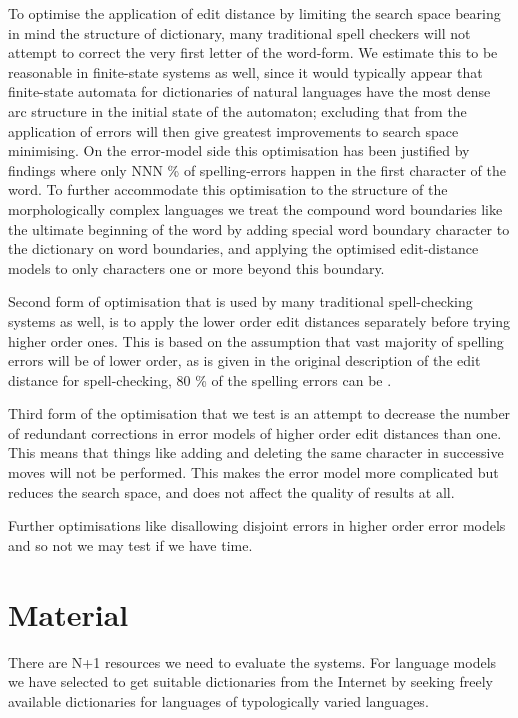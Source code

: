 \documentclass[11pt]{article}
\begin{document}
To optimise the application of edit distance by limiting the search space
bearing in mind the structure of dictionary, many traditional spell checkers
will not attempt to correct the very first letter of the word-form. We estimate
this to be reasonable in finite-state systems as well, since it would typically
appear that finite-state automata for dictionaries of natural languages have
the most dense arc structure in the initial state of the automaton; excluding
that from the application of errors will then give greatest improvements to
search space minimising. On the error-model side this optimisation has been
justified by findings where only NNN \% of spelling-errors happen in the first
character of the word\cite{Yannakoudakis/1983}. To further accommodate this
optimisation to the structure of the morphologically complex languages we treat
the compound word boundaries like the ultimate beginning of the word by adding
special word boundary character to the dictionary on word boundaries, and
applying the optimised edit-distance models to only characters one or more
beyond this boundary.

Second form of optimisation that is used by many traditional spell-checking
systems as well, is to apply the lower order edit distances separately before
trying higher order ones. This is based on the assumption that vast majority
of spelling errors will be of lower order, as is given in the original
description of the edit distance for spell-checking, 80 \% of the spelling
errors can be \cite{Pollock/1984}.

Third form of the optimisation that we test is an attempt to decrease the
number of redundant corrections in error models of higher order edit distances
than one. This means that things like  adding and deleting the
same character in successive moves will not be performed. This makes the error
model more complicated but reduces the search space, and does not affect the
quality of results at all.

Further optimisations like disallowing disjoint errors in higher order error
models and so not we may test if we have time.

\section{Material}
\label{sec:materials}

There are N+1 resources we need to evaluate the systems. For language models
we have selected to get suitable dictionaries from the Internet by seeking
freely available dictionaries for languages of typologically varied
languages.
\end{document}
